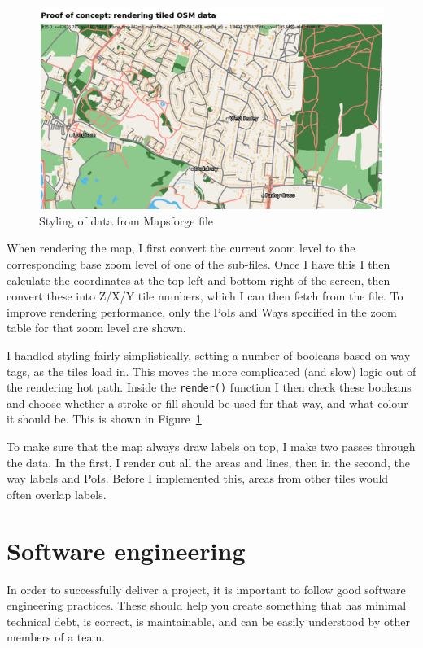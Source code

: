 \documentclass{final_report}
\begin{document}
\begin{figure}[ht]
    \centering
    \includegraphics[width=\textwidth]{../proof-of-concepts/4-rendering-osm-data/screenshots/styled.png}
    \caption{Styling of data from Mapsforge file}\label{fig:rendering-osm-data}
\end{figure}

When rendering the map, I first convert the current zoom level to the corresponding base zoom level of one of the sub-files. Once I have this I then calculate the coordinates at the top-left and bottom right of the screen, then convert these into Z/X/Y tile numbers, which I can then fetch from the file. To improve rendering performance, only the PoIs and Ways specified in the zoom table for that zoom level are shown.

I handled styling fairly simplistically, setting a number of booleans based on way tags, as the tiles load in. This moves the more complicated (and slow) logic out of the rendering hot path. Inside the \texttt{render()} function I then check these booleans and choose whether a stroke or fill should be used for that way, and what colour it should be. This is shown in Figure~\ref{fig:rendering-osm-data}.

To make sure that the map always draw labels on top, I make two passes through the data. In the first, I render out all the areas and lines, then in the second, the way labels and PoIs. Before I implemented this, areas from other tiles would often overlap labels.

\clearpage
\chapter{Software engineering}\label{sec:software-engineering}

In order to successfully deliver a project, it is important to follow good software engineering practices. These should help you create something that has minimal technical debt, is correct, is maintainable, and can be easily understood by other members of a team.
\end{document}
